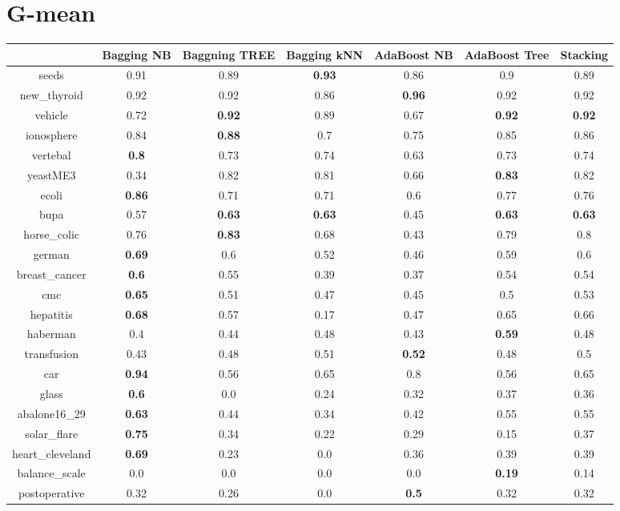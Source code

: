 \documentclass{article}%
\begin{document}
\section*{G{-}mean}%
\begin{tabular}{c|cccccc}%
&Bagging NB&Baggning TREE&Bagging kNN&AdaBoost NB&AdaBoost Tree&Stacking\\%
\hline%
seeds&0.91&0.89&\textbf{0.93}&0.86&0.9&0.89\\%
new\_thyroid&0.92&0.92&0.86&\textbf{0.96}&0.92&0.92\\%
vehicle&0.72&\textbf{0.92}&0.89&0.67&\textbf{0.92}&\textbf{0.92}\\%
ionosphere&0.84&\textbf{0.88}&0.7&0.75&0.85&0.86\\%
vertebal&\textbf{0.8}&0.73&0.74&0.63&0.73&0.74\\%
yeastME3&0.34&0.82&0.81&0.66&\textbf{0.83}&0.82\\%
ecoli&\textbf{0.86}&0.71&0.71&0.6&0.77&0.76\\%
bupa&0.57&\textbf{0.63}&\textbf{0.63}&0.45&\textbf{0.63}&\textbf{0.63}\\%
horse\_colic&0.76&\textbf{0.83}&0.68&0.43&0.79&0.8\\%
german&\textbf{0.69}&0.6&0.52&0.46&0.59&0.6\\%
breast\_cancer&\textbf{0.6}&0.55&0.39&0.37&0.54&0.54\\%
cmc&\textbf{0.65}&0.51&0.47&0.45&0.5&0.53\\%
hepatitis&\textbf{0.68}&0.57&0.17&0.47&0.65&0.66\\%
haberman&0.4&0.44&0.48&0.43&\textbf{0.59}&0.48\\%
transfusion&0.43&0.48&0.51&\textbf{0.52}&0.48&0.5\\%
car&\textbf{0.94}&0.56&0.65&0.8&0.56&0.65\\%
glass&\textbf{0.6}&0.0&0.24&0.32&0.37&0.36\\%
abalone16\_29&\textbf{0.63}&0.44&0.34&0.42&0.55&0.55\\%
solar\_flare&\textbf{0.75}&0.34&0.22&0.29&0.15&0.37\\%
heart\_cleveland&\textbf{0.69}&0.23&0.0&0.36&0.39&0.39\\%
balance\_scale&0.0&0.0&0.0&0.0&\textbf{0.19}&0.14\\%
postoperative&0.32&0.26&0.0&\textbf{0.5}&0.32&0.32\\%
\end{tabular}

%
\end{document}
